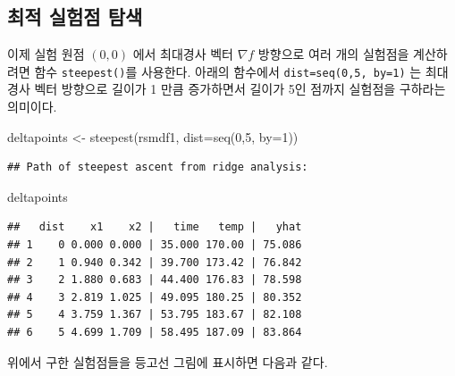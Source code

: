 \documentclass[
]{book}
\newenvironment{Shaded}{\begin{snugshade}}{\end{snugshade}}
\newcommand{\AttributeTok}[1]{\textcolor[rgb]{0.77,0.63,0.00}{#1}}
\newcommand{\DecValTok}[1]{\textcolor[rgb]{0.00,0.00,0.81}{#1}}
\newcommand{\FloatTok}[1]{\textcolor[rgb]{0.00,0.00,0.81}{#1}}
\newcommand{\FunctionTok}[1]{\textcolor[rgb]{0.00,0.00,0.00}{#1}}
\newcommand{\NormalTok}[1]{#1}
\newcommand{\OtherTok}[1]{\textcolor[rgb]{0.56,0.35,0.01}{#1}}
\newcommand{\SpecialCharTok}[1]{\textcolor[rgb]{0.00,0.00,0.00}{#1}}
\newcommand{\StringTok}[1]{\textcolor[rgb]{0.31,0.60,0.02}{#1}}
\theoremstyle{definition}
\theoremstyle{definition}
\theoremstyle{definition}
\theoremstyle{definition}
\theoremstyle{remark}
\begin{document}
\hypertarget{uxcd5cuxc801-uxc2e4uxd5d8uxc810-uxd0d0uxc0c9}{%
\subsection{최적 실험점 탐색}\label{uxcd5cuxc801-uxc2e4uxd5d8uxc810-uxd0d0uxc0c9}}

이제 실험 원점 \((0,0)\) 에서 최대경사 벡터 \(\nabla f\) 방향으로 여러 개의 실험점을 계산하려면 함수 \texttt{steepest()}를 사용한다.
아래의 함수에서 \texttt{dist=seq(0,5,\ by=1)} 는 최대경사 벡터 방향으로 길이가 1 만큼 증가하면서 길이가 5인 점까지 실험점을 구하라는 의미이다.

\begin{Shaded}
\begin{Highlighting}[]
\NormalTok{deltapoints }\OtherTok{\textless{}{-}} \FunctionTok{steepest}\NormalTok{(rsmdf1, }\AttributeTok{dist=}\FunctionTok{seq}\NormalTok{(}\DecValTok{0}\NormalTok{,}\DecValTok{5}\NormalTok{, }\AttributeTok{by=}\DecValTok{1}\NormalTok{))}
\end{Highlighting}
\end{Shaded}

\begin{verbatim}
## Path of steepest ascent from ridge analysis:
\end{verbatim}

\begin{Shaded}
\begin{Highlighting}[]
\NormalTok{deltapoints}
\end{Highlighting}
\end{Shaded}

\begin{verbatim}
##   dist    x1    x2 |   time   temp |   yhat
## 1    0 0.000 0.000 | 35.000 170.00 | 75.086
## 2    1 0.940 0.342 | 39.700 173.42 | 76.842
## 3    2 1.880 0.683 | 44.400 176.83 | 78.598
## 4    3 2.819 1.025 | 49.095 180.25 | 80.352
## 5    4 3.759 1.367 | 53.795 183.67 | 82.108
## 6    5 4.699 1.709 | 58.495 187.09 | 83.864
\end{verbatim}

위에서 구한 실험점들을 등고선 그림에 표시하면 다음과 같다.

\begin{Shaded}
\end{Shaded}
\end{document}
